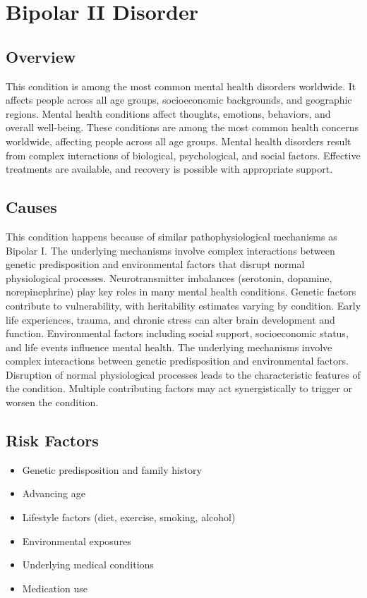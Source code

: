 \chapter{Bipolar II Disorder}
\label{sec:Bipolar II Disorder}

\section{Overview}
This condition is among the most common mental health disorders worldwide. It affects people across all age groups, socioeconomic backgrounds, and geographic regions. Mental health conditions affect thoughts, emotions, behaviors, and overall well-being. These conditions are among the most common health concerns worldwide, affecting people across all age groups. Mental health disorders result from complex interactions of biological, psychological, and social factors. Effective treatments are available, and recovery is possible with appropriate support.
\section{Causes}
This condition happens because of similar pathophysiological mechanisms as Bipolar I. The underlying mechanisms involve complex interactions between genetic predisposition and environmental factors that disrupt normal physiological processes. Neurotransmitter imbalances (serotonin, dopamine, norepinephrine) play key roles in many mental health conditions. Genetic factors contribute to vulnerability, with heritability estimates varying by condition. Early life experiences, trauma, and chronic stress can alter brain development and function. Environmental factors including social support, socioeconomic status, and life events influence mental health. The underlying mechanisms involve complex interactions between genetic predisposition and environmental factors. Disruption of normal physiological processes leads to the characteristic features of the condition. Multiple contributing factors may act synergistically to trigger or worsen the condition.
\section{Risk Factors}
\begin{itemize}[noitemsep]
  \item Genetic predisposition and family history
  \item Advancing age
  \item Lifestyle factors (diet, exercise, smoking, alcohol)
  \item Environmental exposures
  \item Underlying medical conditions
  \item Medication use
\end{itemize}
